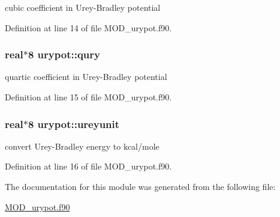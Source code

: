 cubic coefficient in Urey-\/\-Bradley potential 



Definition at line 14 of file M\-O\-D\-\_\-urypot.\-f90.

\hypertarget{classurypot_aae2e6dc6777babb5c57ef1354587f756}{
\subsubsection[{qury}]{\setlength{\rightskip}{0pt plus 5cm}real$\ast$8 urypot\-::qury}}\label{classurypot_aae2e6dc6777babb5c57ef1354587f756}


quartic coefficient in Urey-\/\-Bradley potential 



Definition at line 15 of file M\-O\-D\-\_\-urypot.\-f90.

\hypertarget{classurypot_ae630f4799e1a59f45c7924ba7a44d05e}{
\subsubsection[{ureyunit}]{\setlength{\rightskip}{0pt plus 5cm}real$\ast$8 urypot\-::ureyunit}}\label{classurypot_ae630f4799e1a59f45c7924ba7a44d05e}


convert Urey-\/\-Bradley energy to kcal/mole 



Definition at line 16 of file M\-O\-D\-\_\-urypot.\-f90.



The documentation for this module was generated from the following file\-:\begin{DoxyCompactItemize}
\item 
\hyperlink{MOD__urypot_8f90}{M\-O\-D\-\_\-urypot.\-f90}\end{DoxyCompactItemize}
